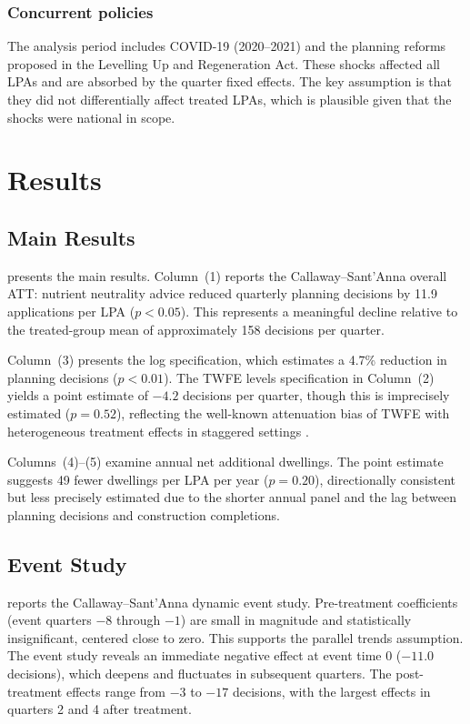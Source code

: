 \documentclass[12pt]{article}
\begin{document}
\subsubsection*{Concurrent policies} The analysis period includes COVID-19 (2020--2021) and the planning reforms proposed in the Levelling Up and Regeneration Act. These shocks affected all LPAs and are absorbed by the quarter fixed effects. The key assumption is that they did not differentially affect treated LPAs, which is plausible given that the shocks were national in scope.

\section{Results}
\label{sec:results}

\subsection{Main Results}



 presents the main results. Column~(1) reports the Callaway--Sant'Anna overall ATT: nutrient neutrality advice reduced quarterly planning decisions by 11.9 applications per LPA ($p < 0.05$). This represents a meaningful decline relative to the treated-group mean of approximately 158 decisions per quarter.

Column~(3) presents the log specification, which estimates a 4.7\% reduction in planning decisions ($p < 0.01$). The TWFE levels specification in Column~(2) yields a point estimate of $-4.2$ decisions per quarter, though this is imprecisely estimated ($p = 0.52$), reflecting the well-known attenuation bias of TWFE with heterogeneous treatment effects in staggered settings \citep{GoodmanBacon2021}.

Columns~(4)--(5) examine annual net additional dwellings. The point estimate suggests 49 fewer dwellings per LPA per year ($p = 0.20$), directionally consistent but less precisely estimated due to the shorter annual panel and the lag between planning decisions and construction completions.

\subsection{Event Study}



 reports the Callaway--Sant'Anna dynamic event study. Pre-treatment coefficients (event quarters $-8$ through $-1$) are small in magnitude and statistically insignificant, centered close to zero. This supports the parallel trends assumption. The event study reveals an immediate negative effect at event time 0 ($-11.0$ decisions), which deepens and fluctuates in subsequent quarters. The post-treatment effects range from $-3$ to $-17$ decisions, with the largest effects in quarters 2 and 4 after treatment.
\end{document}
